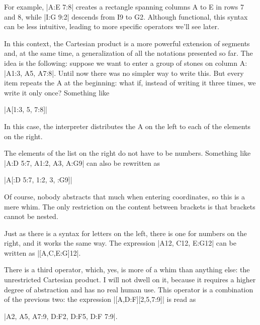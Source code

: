 \begin{goban}[9, stone = {radius = 4pt}, mark = {line = {color = red}}]
For example, |A:E 7:8| creates a rectangle spanning columns A to E in rows 7 and 8, while |I:G 9:2| descends from I9 to G2. Although functional, this syntax can be less intuitive, leading to more specific operators we’ll see later.


	In this context, the Cartesian product is a more powerful extension of segments and, at the same time, a generalization of all the notations presented so far. The idea is the following: suppose we want to enter a group of stones on column A: |A1:3, A5, A7:8|. Until now there was no simpler way to write this. But every item repeats the A at the beginning: what if, instead of writing it three times, we write it only once? Something like
	\begin{center}
		|A[1:3, 5, 7:8]|
	\end{center}
	In this case, the interpreter distributes the A on the left to each of the elements on the right.

	The elements of the list on the right do not have to be numbers. Something like |A:D 5:7, A1:2, A3, A:G9| can also be rewritten as
	\begin{center}
		|A[:D 5:7, 1:2, 3, :G9]|
	\end{center}
	Of course, nobody abstracts that much when entering coordinates, so this is a mere whim. The only restriction on the content between brackets is that brackets cannot be nested.

	Just as there is a syntax for letters on the left, there is one for numbers on the right, and it works the same way. The expression |A12, C12, E:G12| can be written as |[A,C,E:G]12|.

	There is a third operator, which, yes, is more of a whim than anything else: the unrestricted Cartesian product. I will not dwell on it, because it requires a higher degree of abstraction and has no real human use. This operator is a combination of the previous two: the expression |[A,D:F][2,5,7:9]| is read as
	\begin{center}
		|A2, A5, A7:9, D:F2, D:F5, D:F 7:9|.
	\end{center}

	\begin{codeexample}[width=4cm]
		\begin{goban}
			\stones[b]{[A, D:F][2, 5, 7:9]}
		\end{goban}
	\end{codeexample}


\end{goban}
